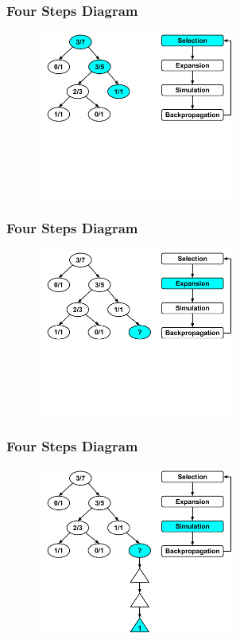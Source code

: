 \documentclass{beamer}
\begin{document}
\begin{frame}[fragile]
\frametitle{Four Steps Diagram}
\begin{figure}[h]
	\includegraphics[width=6.5cm]{Diagrams/MCTSShort/MCTSShortTwoOneThree.pdf}
	\centering
\end{figure}
\end{frame}

\begin{frame}[fragile]
\frametitle{Four Steps Diagram}
\begin{figure}[h]
	\includegraphics[width=6.5cm]{Diagrams/MCTSShort/MCTSShortTwoTwo.pdf}
	\centering
\end{figure}
\end{frame}

\begin{frame}[fragile]
\frametitle{Four Steps Diagram}
\begin{figure}[h]
	\includegraphics[width=6.5cm]{Diagrams/MCTSShort/MCTSShortTwoThree.pdf}
	\centering
\end{figure}
\end{frame}
\end{document}
